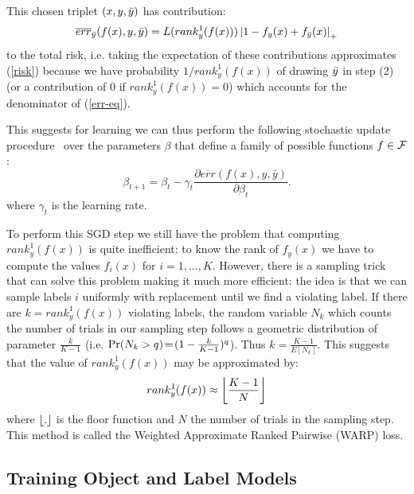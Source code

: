 This chosen triplet $(x,y,{\bar{y}})$ has contribution:
\begin{equation}
\label{eq-err}
\overline{err}_{{\bar{y}}}(f(x),y,{\bar{y}}) = {L}(rank^1_y(f(x))) \left |1 - f_y(x)+ f_{\bar{y}}(x)\right|_+
\end{equation}
to the total risk, i.e. taking the expectation of these contributions
approximates (\ref{risk}) because we have  probability 
$1/rank^1_{y}(f(x))$ of drawing ${\bar{y}}$ in step (2) (or a contribution of 0 if 
$rank^1_{y}(f(x))=0$) which accounts for
the denominator of (\ref{err-eq}).

This suggests for learning we can thus perform the following stochastic update procedure~\citep{robbins_monro:1951} over the parameters $\beta$
 that define a family of possible functions $f \in {\cal F}$:
\begin{equation}
\label{eq:sgdstep}
\beta_{t+1} = \beta_t - \gamma_t \frac{\partial \overline{err}(f(x),y,\bar{y})}{\partial \beta_t}.
\end{equation}
where $\gamma_t$ is the learning rate.
\fi 

To perform this SGD step we still have the problem that computing  $rank^1_y(f(x))$  is quite inefficient:
to know the rank of $f_y(x)$ we have to compute the values $f_i(x)$ for  $i=1,\dots,K$.
However, there is a sampling trick that can solve this problem making it much more efficient:
the idea is that we can sample labels $i$ uniformly with replacement until we find a violating label. 
If there are $k=rank^1_y(f(x))$ violating labels, the random
variable $N_k$ which counts the number of trials in our sampling step
follows a geometric distribution of parameter $\frac{k}{K-1}$
(i.e. $\text{Pr}(N_k > q)\! =\!  (1-\frac{k}{K-1})^q$). Thus
$k=\frac{K-1}{E[N_k]}$. This suggests that the value of $rank^1_y(f(x))$
 may be approximated by:
$$rank^1_y(f(x)) \approx \left \lfloor \frac{K-1}{N} \right \rfloor$$
where $\left \lfloor . \right \rfloor$ is the floor function and $N$ the number of trials
in the sampling step.
This method is called the Weighted Approximate Ranked Pairwise (WARP) loss.

\subsection{Training Object and Label Models}
\label{olmodel}

